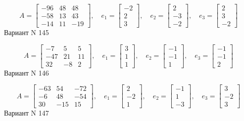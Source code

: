 \documentclass[11pt]{report}
\begin{document}
$$A = \left[\begin{matrix}-96 & 48 & 48\\-58 & 13 & 43\\-14 & 11 & -19\end{matrix}\right],\quad e_1 = \left[\begin{matrix}-2\\2\\3\end{matrix}\right],\quad e_2 = \left[\begin{matrix}2\\-3\\-2\end{matrix}\right],\quad e_3 = \left[\begin{matrix}2\\3\\-2\end{matrix}\right]$$Вариант N 145

$$A = \left[\begin{matrix}-7 & 5 & 5\\-47 & 21 & 11\\32 & -8 & 2\end{matrix}\right],\quad e_1 = \left[\begin{matrix}3\\1\\1\end{matrix}\right],\quad e_2 = \left[\begin{matrix}-1\\-1\\1\end{matrix}\right],\quad e_3 = \left[\begin{matrix}-1\\-1\\2\end{matrix}\right]$$Вариант N 146

$$A = \left[\begin{matrix}-63 & 54 & -72\\-6 & 48 & -54\\30 & -15 & 15\end{matrix}\right],\quad e_1 = \left[\begin{matrix}2\\-2\\1\end{matrix}\right],\quad e_2 = \left[\begin{matrix}-1\\1\\-3\end{matrix}\right],\quad e_3 = \left[\begin{matrix}3\\-2\\3\end{matrix}\right]$$Вариант N 147
\end{document}
